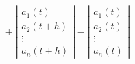 \documentclass[10pt,hyperref={unicode}]{beamer}
\newcommand{\absolute}[1]{\left|#1\right|}
\newcommand{\parentheses}[1]{\left(#1\right)}
\begin{document}
\begin{frame}
\begin{align*}
{{        }
        +
        \absolute{%
            \begin{array}{c}
                a_1\parentheses{t} \\
                a_2\parentheses{t + h} \\
                \vdots \\
                a_n\parentheses{t + h}
            \end{array}
        }
        -
        \absolute{%
            \begin{array}{c}
                a_1\parentheses{t} \\
                a_2\parentheses{t} \\
                \vdots \\
                a_n\parentheses{t}
            \end{array}
        }
    }
\end{align*}
\end{frame}
\end{document}
